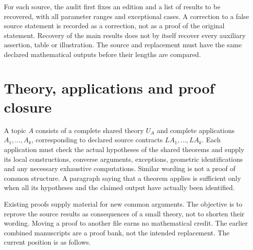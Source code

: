 \documentclass[11pt,a4paper]{article}
\begin{document}
For each source, the audit first fixes an edition and a list of results
to be recovered, with all parameter ranges and exceptional cases. A
correction to a false source statement is recorded as a correction, not
as a proof of the original statement. Recovery of the main results does
not by itself recover every auxiliary assertion, table or illustration.
The source and replacement must have the same declared mathematical
outputs before their lengths are compared.

\section{Theory, applications and proof closure}

A topic $A$ consists of a complete shared theory $U_A$ and complete
applications $A_1,\ldots,A_k$, corresponding to declared source contracts
$LA_1,\ldots,LA_k$. Each application must check the actual hypotheses of
the shared theorems and supply its local constructions, converse
arguments, exceptions, geometric identifications and any necessary
exhaustive computations. Similar wording is not a proof of common
structure. A paragraph saying that a theorem applies is sufficient only
when all its hypotheses and the claimed output have actually been
identified.

Existing proofs supply material for new common arguments. The objective is
to reprove the source results as consequences of a small theory, not to
shorten their wording. Moving a proof to another file earns no mathematical
credit. The earlier combined manuscripts are a proof bank, not the intended
replacement. The current position is as follows.
\end{document}

